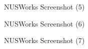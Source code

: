 \documentclass[fyp]{socreport}
\begin{document}
\begin{figure}
\caption{NUSWorks Screenshot (5)}
\label{screen-5}
\end{figure}

\begin{figure}
\caption{NUSWorks Screenshot (6)}
\label{screen-6}
\end{figure}

\begin{figure}
\caption{NUSWorks Screenshot (7)}
\label{screen-7}
\end{figure}
\end{document}
